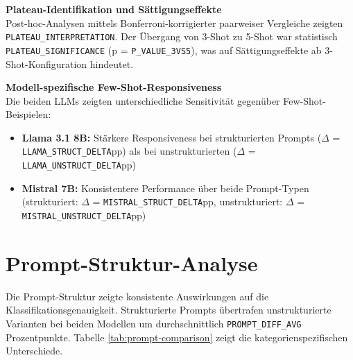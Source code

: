 \textbf{Plateau-Identifikation und Sättigungseffekte}\\
Post-hoc-Analysen mittels Bonferroni-korrigierter paarweiser Vergleiche zeigten \texttt{PLATEAU\_INTERPRETATION}. Der Übergang von 3-Shot zu 5-Shot war statistisch \texttt{PLATEAU\_SIGNIFICANCE} (p = \texttt{P\_VALUE\_3VS5}), was auf Sättigungseffekte ab 3-Shot-Konfiguration hindeutet.

\textbf{Modell-spezifische Few-Shot-Responsiveness}\\
Die beiden LLMs zeigten unterschiedliche Sensitivität gegenüber Few-Shot-Beispielen:

\begin{itemize}
\item \textbf{Llama 3.1 8B:} Stärkere Responsiveness bei strukturierten Prompts ($\Delta$ = \texttt{LLAMA\_STRUCT\_DELTA}pp) als bei unstrukturierten ($\Delta$ = \texttt{LLAMA\_UNSTRUCT\_DELTA}pp)
\item \textbf{Mistral 7B:} Konsistentere Performance über beide Prompt-Typen (strukturiert: $\Delta$ = \texttt{MISTRAL\_STRUCT\_DELTA}pp, unstrukturiert: $\Delta$ = \texttt{MISTRAL\_UNSTRUCT\_DELTA}pp)
\end{itemize}


\section{Prompt-Struktur-Analyse}
Die Prompt-Struktur zeigte konsistente Auswirkungen auf die Klassifikationsgenauigkeit. Strukturierte Prompts übertrafen unstrukturierte Varianten bei beiden Modellen um durchschnittlich \texttt{PROMPT\_DIFF\_AVG} Prozentpunkte. Tabelle \ref{tab:prompt-comparison} zeigt die kategorienspezifischen Unterschiede.

